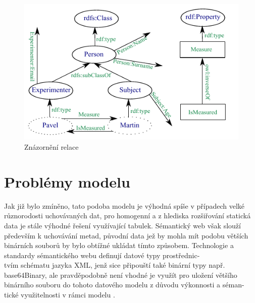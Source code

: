 \documentclass{projekt}
\begin{document}
\begin{figure}[htb]
\begin{center}
\includegraphics[scale=1.6]{miniportal.pdf}
\caption{Znázornění relace}
\end{center}
\end{figure}

\section{Problémy modelu}
\hspace{0.65cm}Jak již bylo zmíněno, tato podoba modelu je výhodná spíše v případech velké různorodosti uchovávaných dat, pro homogenní a z hlediska rozšiřování statická data je stále výhodné řešení využívající tabulek. Sémantický web však slouží především k uchovávání metad, původní data jež by mohla mít podobu větších binárních souborů by bylo obtížné ukládat tímto způsobem. Technologie a standardy sémantického webu definují datové typy prostřednic-\\tvím schématu jazyka XML, jenž sice připouští také binární typy např. base64Binary, ale pravděpodobně není vhodné je využít pro uložení většího binárního souboru do tohoto datového modelu z důvodu výkonnosti a séman-\\tické využitelnosti v rámci modelu \cite{_27}.
\end{document}
